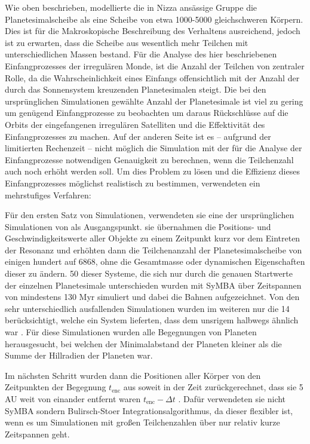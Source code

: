 \documentclass[12pt,a4paper,twoside,open=right,bibliography=totoc]{scrbook}
\renewcommand{\cite}{ \citep}
\begin{document}
Wie oben beschrieben, modellierte die in Nizza ansässige Gruppe die Planetesimalscheibe als eine Scheibe von etwa 1000-5000 gleichschweren Körpern. Dies ist für die Makroskopische Beschreibung des Verhaltens ausreichend, jedoch ist zu erwarten, dass die Scheibe aus wesentlich mehr Teilchen mit unterschiedlichen Massen bestand.
Für die Analyse des hier beschriebenen Einfangprozesses der irregulären Monde, ist die Anzahl der Teilchen von zentraler Rolle, da die Wahrscheinlichkeit eines Einfangs offensichtlich mit der Anzahl der durch das Sonnensystem kreuzenden Planetesimalen steigt.
Die bei den ursprünglichen Simulationen gewählte Anzahl der Planetesimale ist viel zu gering um genügend Einfangprozesse zu beobachten um daraus Rückschlüsse auf die Orbits der eingefangenen irregulären Satelliten und die Effektivität des Einfangprozesses zu machen.
Auf der anderen Seite ist es -- aufgrund der limitierten Rechenzeit -- nicht möglich die Simulation mit der für die Analyse der Einfangprozesse notwendigen Genauigkeit zu berechnen, wenn die Teilchenzahl auch noch erhöht werden soll.
Um dies Problem zu lösen und die Effizienz dieses Einfangprozesses möglichst realistisch zu bestimmen, verwendeten \cite{Nesvorny2007} ein mehrstufiges Verfahren:

Für den ersten Satz von Simulationen, verwendeten sie eine der ursprünglichen Simulationen von \cite{Gomes2005} als Ausgangspunkt.
sie übernahmen die Positions- und Geschwindigkeitswerte aller Objekte zu einem Zeitpunkt kurz vor dem Eintreten der Resonanz und erhöhten dann die Teilchenanzahl der Planetesimalscheibe von einigen hundert auf 6868, %
ohne die Gesamtmasse oder dynamischen Eigenschaften dieser zu ändern. 50 dieser Systeme, die sich nur durch die genauen Startwerte der einzelnen Planetesimale unterschieden wurden mit SyMBA über Zeitspannen von mindestens 130 Myr simuliert und dabei die Bahnen aufgezeichnet.
Von den sehr unterschiedlich ausfallenden Simulationen wurden im weiteren nur die 14 berücksichtigt, welche ein System lieferten, dass dem unsrigem halbwegs ähnlich war\cite{Nesvorny2007}.
Für diese Simulationen wurden alle Begegnungen von Planeten herausgesucht, bei welchen der Minimalabstand der Planeten kleiner als die Summe der Hillradien der Planeten war.

Im nächsten Schritt wurden dann die Positionen aller Körper von den Zeitpunkten der Begegnung $t_{\mathrm{enc}}$ aus soweit in der Zeit zurückgerechnet, dass sie 5 AU weit von einander entfernt waren  $t_{\mathrm{enc}} - \Delta t$\cite{Nesvorny2007}.
Dafür verwendeten sie nicht SyMBA sondern Bulirsch-Stoer Integrationsalgorithmus, da dieser flexibler ist, wenn es um Simulationen mit großen Teilchenzahlen über nur relativ kurze Zeitspannen geht.
\end{document}
